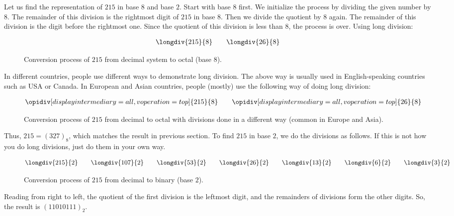 \documentclass{subfile}
\begin{document}
	\begin{example}
		Let us find the representation of $215$ in base $8$ and base $2$. Start with base $8$ first. We initialize the process by dividing the given number by $8$. The remainder of this division is the rightmost digit of $215$ in base $8$. Then we divide the quotient by $8$ again. The remainder of this division is the digit before the rightmost one. Since the quotient of this division is less than $8$, the process is over. Using long division:
			\begin{figure}[H]
				\begin{align*}
				\longdiv{215}{8}
				\qquad
				\longdiv{26}{8}
			\end{align*}
		\caption{Conversion process of $215$ from decimal system to octal (base $8$).}
		\label{fig:base8-1}
			\end{figure}
		In different countries, people use different ways to demonstrate long division. The above way is usually used in English-speaking countries such as USA or Canada. In European and Asian countries, people (mostly) use the following way of doing long division:
			\begin{figure}[H]
				\begin{align*}
				\opidiv[displayintermediary=all,voperation=top]{215}{8}
				\qquad
				\opidiv[displayintermediary=all,voperation=top]{26}{8}
				\end{align*}
			\caption{Conversion process of $215$ from decimal to octal with divisions done in a different way (common in Europe and Asia).}
			\label{fig:base8-2}
			\end{figure}
		Thus, $215=(327)_8$, which matches the result in previous section. To find $215$ in base $2$, we do the divisions as follows. If this is not how you do long divisions, just do them in your own way.
		\begin{figure}[H]
		\begin{align*}
			\longdiv{215}{2}
			\qquad
			\longdiv{107}{2}
			\qquad
			\longdiv{53}{2}
			\qquad
			\longdiv{26}{2}
			\qquad
			\longdiv{13}{2}
			\qquad
			\longdiv{6}{2}
			\qquad
			\longdiv{3}{2}
		\end{align*}
		\caption{Conversion process of $215$ from decimal to binary (base $2$).}
		\label{fig:base2}
		\end{figure}
		Reading from right to left, the quotient of the first division is the leftmost digit, and the remainders of divisions form the other digits. So, the result is $(11010111)_2$.
	\end{example}
\end{document}
